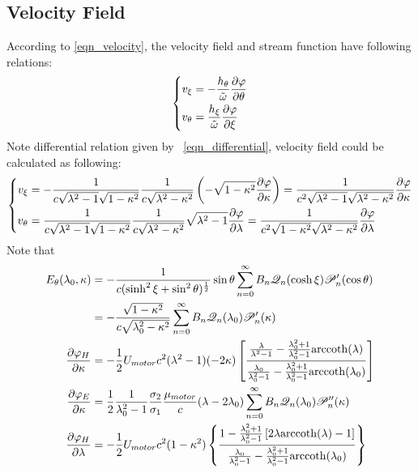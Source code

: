 \documentclass[fontsize=11pt, %
                             paper=a4, %
                             twoside, %
                             captions=tableheading,
                             index=totoc,
                             hyperref]{labbook}
\begin{document}
\begin{addmargin}[4cm]{0cm}
\subsection{Velocity Field}
According to \ref{eqn_velocity}, the velocity field and stream function have following relations:
\begin{equation}
\left\{
\begin{aligned}
v_{\xi}&=-\frac{h_\theta}{\tilde{\omega}}\frac{\partial \varphi}{\partial \theta}\\
v_{\theta}&=\frac{h_\xi}{\tilde\omega}\frac{\partial \varphi}{\partial \xi}
\end{aligned}
\right.
\end{equation}
Note differential relation given by ~\ref{eqn_differential}, velocity field could be calculated as following:
\begin{equation}
\left\{
\begin{aligned}
v_{\xi}&=-\frac{1}{c\sqrt{\lambda^2-1}\sqrt{1-\kappa^2}}\frac{1}{c\sqrt{\lambda^2-\kappa^2}}\left(-\sqrt{1-\kappa^2}\frac{\partial \varphi}{\partial \kappa}\right)=\frac{1}{c^2\sqrt{\lambda^2-1}\sqrt{\lambda^2-\kappa^2}}\frac{\partial \varphi}{\partial \kappa}\\
v_{\theta}&=\frac{1}{c\sqrt{\lambda^2-1}\sqrt{1-\kappa^2}}\frac{1}{c\sqrt{\lambda^2-\kappa^2}}\sqrt{\lambda^2-1}\frac{\partial \varphi}{\partial \lambda}=\frac{1}{c^2\sqrt{1-\kappa^2}\sqrt{\lambda^2-\kappa^2}}\frac{\partial \varphi}{\partial \lambda}
\end{aligned}
\right.
\end{equation}
Note that
\begin{equation}\label{eqn-1st}
\begin{aligned}
E_\theta(\lambda_0,\kappa)&=-\frac{1}{c(\sinh^2\xi+\sin^2\theta)^{\frac{1}{2}}}\sin\theta\sum_{n=0}^\infty B_n\mathscr{Q}_n(\cosh\xi)\mathscr{P}_n^\prime(\cos\theta)\\
&=-\frac{\sqrt{1-\kappa^2}}{c\sqrt{\lambda_0^2-\kappa^2}}\sum_{n=0}^\infty B_n\mathscr{Q}_n(\lambda_0)\mathscr{P}_n^\prime(\kappa)\\
\pd{\varphi_H}{\kappa}&=-\frac{1}{2}U_{motor}c^2(\lambda^2-1)(-2\kappa)\left[\frac{\frac{\lambda}{\lambda^2-1}-\frac{\lambda_0^2+1}{\lambda_0^2-1}\mathrm{arccoth}(\lambda)}{\frac{\lambda_0}{\lambda_0^2-1}-\frac{\lambda_0^2+1}{\lambda_0^2-1}\mathrm{arccoth}(\lambda_0)}\right]\\
\pd{\varphi_E}{\kappa}&=\frac{1}{2}\frac{1}{\lambda_0^2-1}\frac{\sigma_2}{\sigma_1}\frac{\mu_{motor}}{c}(\lambda-2\lambda_0)\sum_{n=0}^\infty B_n\mathscr{Q}_n(\lambda_0)\mathscr{P}_n^{\prime\prime}(\kappa)\\
\pd{\varphi_H}{\lambda}&=-\frac{1}{2}U_{motor}c^2(1-\kappa^2)\left\{\frac{1-\frac{\lambda_0^2+1}{\lambda_0^2-1}\left[2\lambda\mathrm{arccoth}(\lambda)-1\right]}{\frac{\lambda_0}{\lambda_0^2-1}-\frac{\lambda_0^2+1}{\lambda_0^2-1}\mathrm{arccoth}(\lambda_0)}\right\}\\

\end{aligned}
\end{equation}
\end{addmargin}
\end{document}
